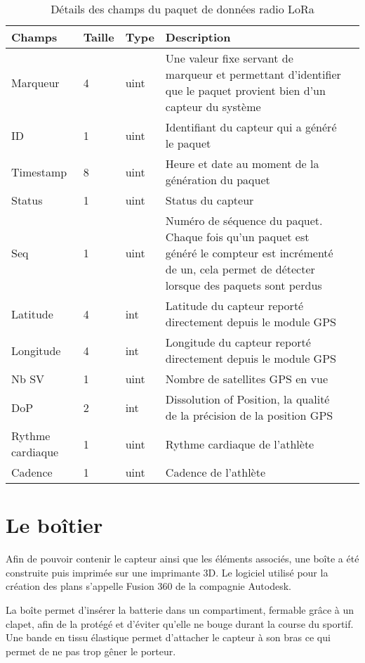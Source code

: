 \begin{table}[htb]
\caption{Détails des champs du paquet de données radio LoRa}
\label{tab:sensor_packet_format}
\centering
\begin{tabular}{ l l l p{9cm} l }
\toprule
Champs & Taille & Type & Description \\
\midrule
Marqueur & 4 & uint & Une valeur fixe servant de marqueur et permettant d'identifier que le paquet provient bien d'un capteur du système \\
ID & 1 & uint & Identifiant du capteur qui a généré le paquet \\
Timestamp & 8 & uint & Heure et date au moment de la génération du paquet \\
Status & 1 & uint & Status du capteur \\
Seq & 1 & uint & Numéro de séquence du paquet. Chaque fois qu'un paquet est généré le compteur est incrémenté de un, cela permet de détecter lorsque des paquets sont perdus \\
Latitude & 4 & int & Latitude du capteur reporté directement depuis le module GPS \\
Longitude & 4 & int & Longitude du capteur reporté directement depuis le module GPS \\
Nb SV & 1 & uint & Nombre de satellites GPS en vue \\
DoP & 2 & int & Dissolution of Position, la qualité de la précision de la position GPS \\
Rythme cardiaque & 1 & uint & Rythme cardiaque de l'athlète \\
Cadence & 1 & uint & Cadence de l'athlète \\
\bottomrule 
\end{tabular}
\end{table}

\section{Le boîtier}

Afin de pouvoir contenir le capteur ainsi que les éléments associés, une boîte a été construite puis imprimée sur une imprimante 3D. Le logiciel utilisé pour la création des plans s'appelle Fusion 360 de la compagnie Autodesk.

La boîte permet d'insérer la batterie dans un compartiment, fermable grâce à un clapet, afin de la protégé et d'éviter qu'elle ne bouge durant la course du sportif. Une bande en tissu élastique permet d'attacher le capteur à son bras ce qui permet de ne pas trop gêner le porteur.

